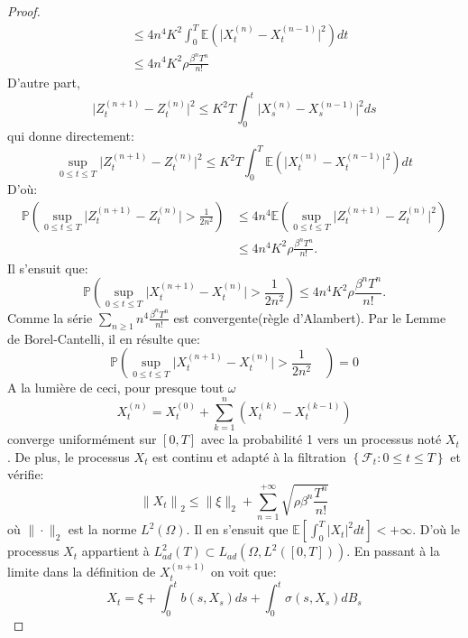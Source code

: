 \documentclass[A4paper,12pt]{report}
\newcommand{\E}{{\mathbb{E}}}
\newcommand{\pr}{{\mathbb{P}}}
\begin{document}
\begin{proof}
$$\begin{aligned}
& \leq 4n^{4} K^{2} \int_{0}^{T} \E\left(\lvert X_{t}^{(n)}-X_{t}^{(n-1)}\rvert^{2}\right) d t \\
& \leq 4n^{4} K^{2} \rho \frac{\beta^{n} T^{n}}{n !}
\end{aligned}
$$
D'autre part,
$$
\lvert Z_{t}^{(n+1)}-Z_{t}^{(n)}\rvert^{2} \leq K^{2} T \int_{0}^{t}\lvert X_{s}^{(n)}-X_{s}^{(n-1)}\rvert^{2} d s
$$
qui donne directement:
$$
\sup _{0 \leq t \leq T}\lvert Z_{t}^{(n+1)}-Z_{t}^{(n)}\rvert^{2} \leq K^{2} T \int_{0}^{T} \E\left(\lvert X_{t}^{(n)}-X_{t}^{(n-1)}\rvert^{2}\right) d t
$$
D'où:
$$
\begin{aligned}
\pr\left(\sup _{0 \leq t \leq T}\lvert Z_{t}^{(n+1)}-Z_{t}^{(n)}\rvert > \frac{1}{2 n^{2}}\right) & \leq 4n^{4} \E\left( \sup _{0 \leq t \leq T}\lvert Z_{t}^{(n+1)}-Z_{t}^{(n)}\rvert^{2}\right) \\
& \leq 4n^{4} K^{2} \rho \frac{\beta^{n} T^{n}}{n !} .
\end{aligned}
$$
Il s'ensuit que:
$$
\pr\left(\sup _{0 \leq t \leq T}\lvert X_{t}^{(n+1)}-X_{t}^{(n)}\rvert > \frac{1}{2 n^{2}}\right) \leq 4n^{4} K^{2} \rho \frac{\beta^{n} T^{n}}{n !} .
$$
Comme la série $\sum_{n \geq 1} n^{4} \frac{\beta^{n} T^{n}}{n !}$ est convergente(règle d'Alambert). Par le Lemme de Borel-Cantelli, il en résulte que:
$$
\pr\left(\sup _{0 \leq t \leq T}\lvert X_{t}^{(n+1)}-X_{t}^{(n)}\rvert > \frac{1}{2 n^{2}} \quad \right)=0 
$$
A la lumière de ceci, pour presque tout $\omega$
$$X_{t}^{(n)}=X_{t}^{(0)}+\sum_{k=1}^{n}\left(X_{t}^{(k)}-X_{t}^{(k-1)}\right)$$
converge uniformément sur $[0, T]$ avec la probabilité 1 vers un processus noté $X_{t}$. De plus, le processus $X_{t}$ est continu et adapté à la filtration $\left\{\mathcal{F}_{t}: 0 \leq t \leq T\right\}$ et vérifie:
$$
\left\|X_{t}\right\|_{2} \leq\|\xi\|_{2}+\sum_{n=1}^{+\infty} \sqrt{\rho \beta^{n} \frac{T^{n}}{n !}}
$$
où $\|\cdot\|_{2}$ est la norme $L^{2}(\Omega)$. Il en s'ensuit que $\E \left[ \int_{0}^{T}\lvert X_{t} \rvert ^{2} d t\right] <+\infty$. D'où le processus $X_{t}$ appartient à $L_{a d}^{2}(T) \subset L_{a d}\left(\Omega, L^{2}([0, T])\right)$. En passant à la limite dans la définition de $X_{t}^{(n+1)}$ on voit que:
$$X_{t}=\xi+\int_{0}^{t} b\left(s, X_{s}\right) d s+\int_{0}^{t} \sigma\left(s, X_{s}\right) d B_{s}$$
\end{proof}
\end{document}
